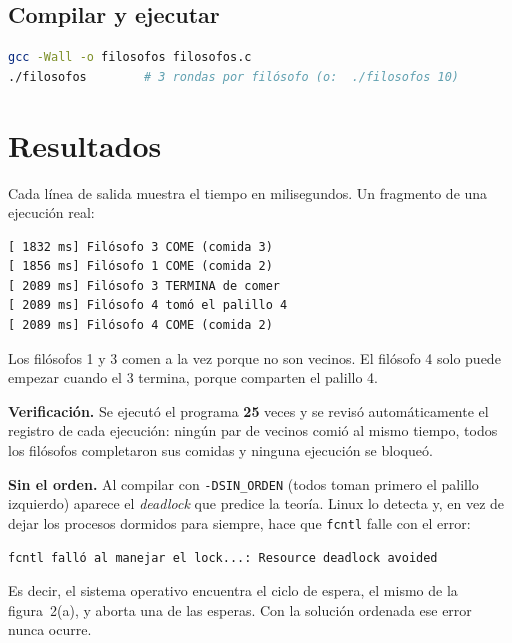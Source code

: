 \documentclass[12pt,letterpaper]{article}
\newcommand{\cod}[1]{\texttt{#1}}
\begin{document}
\subsection{Compilar y ejecutar}
\par\smallskip\noindent\begin{minipage}{\linewidth}
\begin{lstlisting}[numbers=none,language=bash]
gcc -Wall -o filosofos filosofos.c
./filosofos        # 3 rondas por filósofo (o:  ./filosofos 10)
\end{lstlisting}
\end{minipage}\par\smallskip

\section{Resultados}
Cada línea de salida muestra el tiempo en milisegundos. Un fragmento de una ejecución real:
\par\smallskip\noindent\begin{minipage}{\linewidth}
\begin{lstlisting}[numbers=none,language={},basicstyle=\ttfamily\scriptsize]
[ 1832 ms] Filósofo 3 COME (comida 3)
[ 1856 ms] Filósofo 1 COME (comida 2)
[ 2089 ms] Filósofo 3 TERMINA de comer
[ 2089 ms] Filósofo 4 tomó el palillo 4
[ 2089 ms] Filósofo 4 COME (comida 2)
\end{lstlisting}
\end{minipage}\par\smallskip
Los filósofos 1 y 3 comen a la vez porque no son vecinos. El filósofo 4 solo puede empezar cuando el 3 termina, porque comparten el palillo 4.

\textbf{Verificación.} Se ejecutó el programa \textbf{25} veces y se revisó automáticamente el registro de cada ejecución: ningún par de vecinos comió al mismo tiempo, todos los filósofos completaron sus comidas y ninguna ejecución se bloqueó.

\textbf{Sin el orden.} Al compilar con \cod{-DSIN\_ORDEN} (todos toman primero el palillo izquierdo) aparece el \emph{deadlock} que predice la teoría. Linux lo detecta y, en vez de dejar los procesos dormidos para siempre, hace que \cod{fcntl} falle con el error:
\par\smallskip\noindent\begin{minipage}{\linewidth}
\begin{lstlisting}[numbers=none,language={},basicstyle=\ttfamily\scriptsize]
fcntl falló al manejar el lock...: Resource deadlock avoided
\end{lstlisting}
\end{minipage}\par\smallskip
Es decir, el sistema operativo encuentra el ciclo de espera, el mismo de la figura~2(a), y aborta una de las esperas. Con la solución ordenada ese error nunca ocurre.
\end{document}
